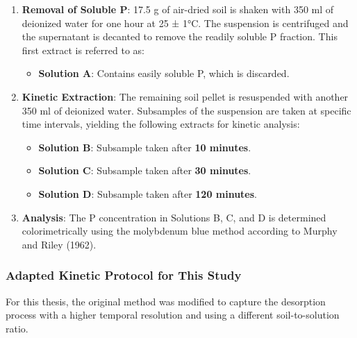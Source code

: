 \documentclass[
  a4paper,
]{article}
\providecommand{\tightlist}{%
  \setlength{\itemsep}{0pt}\setlength{\parskip}{0pt}}\usepackage{longtable,booktabs,array}
\begin{document}
\begin{enumerate}
\def\labelenumi{\arabic{enumi}.}
\tightlist
\item
  \textbf{Removal of Soluble P}: 17.5 g of air-dried soil is shaken with
  350 ml of deionized water for one hour at 25 ± 1°C. The suspension is
  centrifuged and the supernatant is decanted to remove the readily
  soluble P fraction. This first extract is referred to as:

  \begin{itemize}
  \tightlist
  \item
    \textbf{Solution A}: Contains easily soluble P, which is discarded.
  \end{itemize}
\item
  \textbf{Kinetic Extraction}: The remaining soil pellet is resuspended
  with another 350 ml of deionized water. Subsamples of the suspension
  are taken at specific time intervals, yielding the following extracts
  for kinetic analysis:

  \begin{itemize}
  \tightlist
  \item
    \textbf{Solution B}: Subsample taken after \textbf{10 minutes}.
  \item
    \textbf{Solution C}: Subsample taken after \textbf{30 minutes}.
  \item
    \textbf{Solution D}: Subsample taken after \textbf{120 minutes}.
  \end{itemize}
\item
  \textbf{Analysis}: The P concentration in Solutions B, C, and D is
  determined colorimetrically using the molybdenum blue method according
  to Murphy and Riley (1962).
\end{enumerate}

\subsubsection{Adapted Kinetic Protocol for This
Study}\label{adapted-kinetic-protocol-for-this-study}

For this thesis, the original method was modified to capture the
desorption process with a higher temporal resolution and using a
different soil-to-solution ratio.
\end{document}
